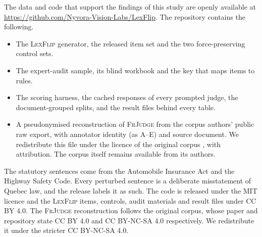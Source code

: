 \documentclass{BVP_JCLLT}
\newcommand{\rev}[1]{#1}
\newcommand{\rev}[1]{{\color{revcol}#1}}
\begin{document}
\rev{The data and code that support the findings of this study are openly
available at \url{https://github.com/Nyvora-Vision-Labs/LexFlip}. The repository
contains the following.

\begin{itemize}\itemsep1pt
\item The \textsc{LexFlip} generator, the released item set and the two
  force-preserving control sets.
\item The expert-audit sample, its blind workbook and the key that maps items to
  rules.
\item The scoring harness, the cached responses of every prompted judge, the
  document-grouped splits, and the result files behind every table.
\item A pseudonymised reconstruction of \textsc{FrJudge} from the corpus
  authors' public raw export, with annotator identity (as A--E) and source
  document. We redistribute this file under the licence of the original corpus
  \cite{beauchemin2025judgebert}, with attribution. The corpus itself remains
  available from its authors.
\end{itemize}

The statutory sentences come from the Automobile Insurance Act and the Highway
Safety Code. Every perturbed sentence is a deliberate misstatement of Quebec law,
and the release labels it as such. The code is released under the MIT licence
and the \textsc{LexFlip} items, controls, audit materials and result files under
CC BY 4.0. The \textsc{FrJudge} reconstruction follows the original corpus,
whose paper and repository state CC BY 4.0 and CC BY-NC-SA 4.0 respectively. We
redistribute it under the stricter CC BY-NC-SA 4.0.}

\flushbottom
\begingroup
\setlength{\parskip}{0pt}

\endgroup
\end{document}
